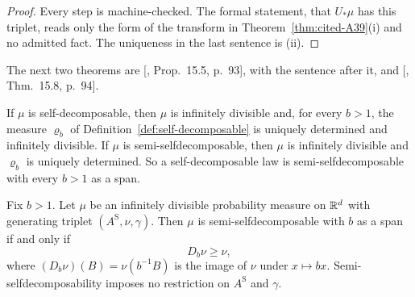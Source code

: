 \begin{proof}
Every step is machine-checked. The formal statement, that $U_*\mu$ has this triplet, reads only
the form of the transform in Theorem~\ref{thm:cited-A39}(i) and no admitted fact. The
uniqueness in the last sentence is (ii).
\end{proof}

The next two theorems are [, Prop.~15.5, p.~93], with the sentence after it,
and [, Thm.~15.8, p.~94].

\begin{theorem}
\label{thm:cited-A43}

If $\mu$ is self-decomposable, then $\mu$ is infinitely divisible and, for every $b > 1$, the
measure $\varrho_b$ of Definition~\ref{def:self-decomposable} is uniquely determined and infinitely
divisible. If $\mu$ is semi-selfdecomposable, then $\mu$ is infinitely divisible and $\varrho_b$ is
uniquely determined. So a self-decomposable law is semi-selfdecomposable with every $b > 1$ as a
span.
\end{theorem}

\begin{theorem}
\label{thm:cited-A44}

Fix $b > 1$. Let $\mu$ be an infinitely divisible probability measure on $\mathbb{R}^d$ with generating
triplet $(A^{\mathrm S}, \nu, \gamma)$. Then $\mu$ is semi-selfdecomposable with $b$ as a span if and only if
\[
  D_b\nu \ge \nu ,
\]
where $(D_b\nu)(B) = \nu(b^{-1}B)$ is the image of $\nu$ under $x \mapsto bx$. Semi-selfdecomposability
imposes no restriction on $A^{\mathrm S}$ and $\gamma$.
\end{theorem}

